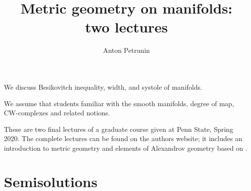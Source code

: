 \documentclass[twoside]{book}
\begin{document}
 
\title{Metric geometry on manifolds:
\\ two lectures}
\author{Anton Petrunin}
\date{}
\maketitle

We discuss Besikovitch inequality, width, and systole of manifolds.

We assume that students familiar with the smooth manifolds, degree of map, CW-complexes and related notions.

These are two final lectures of a graduate course given at Penn State, Spring 2020.
The complete lectures can be found on the authors website;
it includes an introduction to metric geometry \cite{petrunin2020pure}
and elements of Alexandrov geometry based on \cite{alexander-kapovitch-petrunin-2019}.

\thispagestyle{empty}
\tableofcontents
\thispagestyle{empty}

%



%
%
%
\appendix
\chapter{Semisolutions}


%
{\small\sloppy


\printbibliography[heading=bibintoc]
\fussy
}
\end{document}
